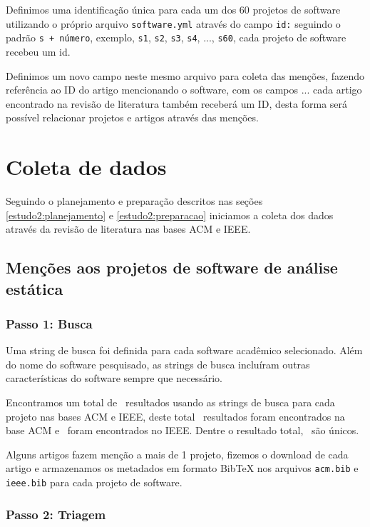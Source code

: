Definimos uma identificação única para cada um dos 60 projetos de software
utilizando o próprio arquivo \texttt{software.yml} através do campo
\texttt{id:} seguindo o padrão \texttt{s + número}, exemplo, \texttt{s1},
\texttt{s2}, \texttt{s3}, \texttt{s4}, ..., \texttt{s60}, cada projeto de software
recebeu um id.

Definimos um novo campo neste mesmo arquivo para coleta das menções, fazendo
referência ao ID do artigo mencionando o software, com os campos ... cada artigo
encontrado na revisão de literatura também receberá um ID, desta forma será possível
relacionar projetos e artigos através das menções.


\section{Coleta de dados}

Seguindo o planejamento e preparação descritos nas seções
\ref{estudo2:planejamento} e \ref{estudo2:preparacao} iniciamos a coleta dos
dados através da revisão de literatura nas bases ACM e IEEE.

\subsection{Menções aos projetos de software de análise estática}



\subsubsection{Passo 1: Busca}

Uma string de busca foi definida para cada software acadêmico selecionado.
Além do nome do software pesquisado, as strings de busca incluíram outras
características do software sempre que necessário.

Encontramos um total de \SearchCount \ resultados usando as strings de busca
para cada projeto nas bases ACM e IEEE, deste total \SearchACMCount \ resultados
foram encontrados na base ACM e \SearchIEEECount \ foram encontrados
no IEEE. Dentre o resultado total, \SearchUniqueCount \ são únicos.

Alguns artigos fazem menção a mais de 1 projeto, fizemos o download de cada
artigo e armazenamos os metadados em formato BibTeX nos arquivos \texttt{acm.bib}
e \texttt{ieee.bib} para cada projeto de software.

\subsubsection{Passo 2: Triagem}

